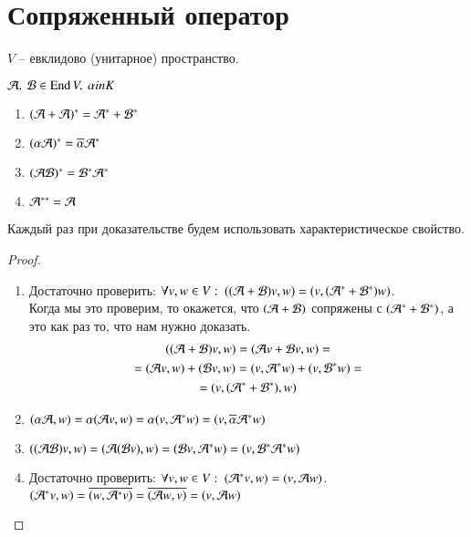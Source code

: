\documentclass[main]{subfiles}
\begin{document}
\chapter{Сопряженный оператор}

$V$ -- евклидово (унитарное) пространство.

\begin{proposition}
    $\mathcal{A}, \ \mathcal{B} \in \operatorname{End} V, \ \alpha in K$
    \begin{enumerate}
        \item $(\mathcal{A} + \mathcal{A})^* = \mathcal{A}^* + \mathcal{B}^*$
        \item $(\alpha \mathcal{A})^* = \overline{\alpha} \mathcal{A}^*$
        \item $(\mathcal{A} \mathcal{B})^* = \mathcal{B}^* \mathcal{A}^*$
        \item $\mathcal{A}^{**} = \mathcal{A}$
    \end{enumerate}
\end{proposition}

Каждый раз при доказательстве будем использовать характеристическое свойство.

\begin{proof}
    \begin{enumerate}
        \item Достаточно проверить: $\forall v, w \in V: \ ((\mathcal{A} + \mathcal{B})v, w) = (v, (\mathcal{A}^* + \mathcal{B}^*) w)$. \\
              Когда мы это проверим, то окажется, что $(\mathcal{A} + \mathcal{B})$ сопряжены с $(\mathcal{A}^* + \mathcal{B}^*)$, а это как раз то, что нам нужно доказать.
              \begin{multline*}
                  ((\mathcal{A} + \mathcal{B})v, w) = (\mathcal{A} v + \mathcal{B} v, w) = \\
                  = (\mathcal{A} v, w) + (\mathcal{B} v, w) = (v, \mathcal{A}^* w) + (v, \mathcal{B}^* w) = \\
                  = (v, (\mathcal{A}^* + \mathcal{B}^*), w)
              \end{multline*}
        \item

              $(\alpha \mathcal{A}, w) = \alpha(\mathcal{A} v, w) = \alpha(v, \mathcal{A}^* w) = (v, \overline{\alpha} \mathcal{A}^* w)$

        \item  $((\mathcal{A} \mathcal{B})v, w)= (\mathcal{A}(\mathcal{B} v), w) = (\mathcal{B} v, \mathcal{A}^* w) = (v, \mathcal{B}^* \mathcal{A}^* w) $
        \item Достаточно проверить: $\forall v, w \in V: \ (\mathcal{A}^* v, w) = (v,\mathcal{A} w)$. \\
              $(\mathcal{A}^* v, w) = \overline{(w, \mathcal{A}^* v)} = \overline{(\mathcal{A} w, v)} = (v, \mathcal{A} w) $
    \end{enumerate}
\end{proof}
\end{document}
